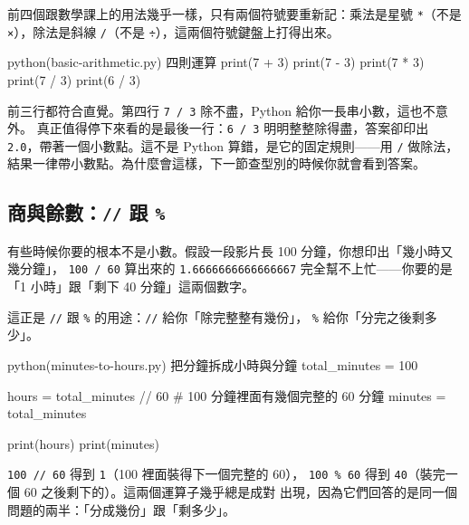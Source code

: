 前四個跟數學課上的用法幾乎一樣，只有兩個符號要重新記：乘法是星號 \texttt{*}（不是
\texttt{×}），除法是斜線 \texttt{/}（不是 \texttt{÷}），這兩個符號鍵盤上打得出來。

\begin{example}{python}{(basic-arithmetic.py) 四則運算}
print(7 + 3)
print(7 - 3)
print(7 * 3)
print(7 / 3)
print(6 / 3)
\end{example}


前三行都符合直覺。第四行 \texttt{7 / 3} 除不盡，Python 給你一長串小數，這也不意外。
真正值得停下來看的是最後一行：\texttt{6 / 3} 明明整整除得盡，答案卻印出
\texttt{2.0}，帶著一個小數點。這不是 Python 算錯，是它的固定規則——用 \texttt{/} 做除法，
結果一律帶小數點。為什麼會這樣，下一節查型別的時候你就會看到答案。

\subsection*{商與餘數：\texttt{//} 跟 \texttt{\%}}

有些時候你要的根本不是小數。假設一段影片長 100 分鐘，你想印出「幾小時又幾分鐘」，
\texttt{100 / 60} 算出來的 \texttt{1.6666666666666667} 完全幫不上忙——你要的是
「1 小時」跟「剩下 40 分鐘」這兩個數字。

這正是 \texttt{//} 跟 \texttt{\%} 的用途：\texttt{//} 給你「除完整整有幾份」，
\texttt{\%} 給你「分完之後剩多少」。

\begin{example}{python}{(minutes-to-hours.py) 把分鐘拆成小時與分鐘}
total_minutes = 100

hours = total_minutes // 60      # 100 分鐘裡面有幾個完整的 60 分鐘
minutes = total_minutes %

print(hours)
print(minutes)
\end{example}


\texttt{100 // 60} 得到 \texttt{1}（100 裡面裝得下一個完整的 60），
\texttt{100 \% 60} 得到 \texttt{40}（裝完一個 60 之後剩下的）。這兩個運算子幾乎總是成對
出現，因為它們回答的是同一個問題的兩半：「分成幾份」跟「剩多少」。

